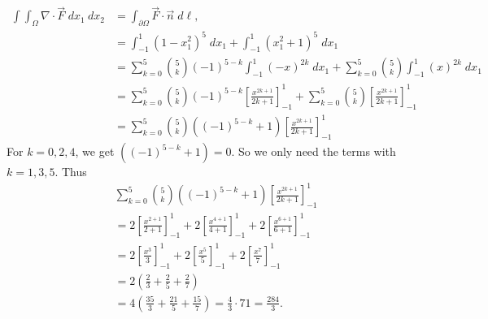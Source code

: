 \documentclass[11pt]{article}
\begin{document}
\begin{solution}
\begin{align*}
        \int \int_{\Omega} \nabla \cdot \vec{F} \;d x_1 \:d x_2 
        &=
        \int_{\partial \Omega}\vec{F}\cdot\vec{n} \;d\ell,
        \\&=
        \int_{-1}^1 (1-x_1^ 2)^ 5 \;dx_1 + \int_{-1}^1 (x_1^2 + 1)^ 5 \;dx_1
        \\&=
        \sum_{k = 0}^5 \binom{5}{k} (-1)^{5-k} \int_{-1}^1 (-x)^{2k} \;dx_1 + \sum_{k = 0}^5 \binom{5}{k}\int_{-1}^1 (x)^{2k} \;dx_1
        \\&=
        \sum_{k = 0}^5 \binom{5}{k} (-1)^{5-k} \left[\frac{x^{2k+1}}{2k+1}\right]_{-1}^1 + \sum_{k = 0}^5 \binom{5}{k} \left[\frac{x^{2k+1}}{2k+1}\right]_{-1}^1
        \\&=
        \sum_{k = 0}^5 \binom{5}{k} \left( (-1)^{5-k} + 1 \right) 
        \left[\frac{x^{2k+1}}{2k+1}\right]_{-1}^1
    \end{align*}
    For $k = 0, 2, 4$, we get $\left( (-1)^{5-k} + 1 \right) = 0$. 
    So we only need the terms with $k = 1, 3, 5$. Thus
    \begin{align*}
        &
        \sum_{k = 0}^5 \binom{5}{k} \left( (-1)^{5-k} + 1 \right) 
        \left[\frac{x^{2k+1}}{2k+1}\right]_{-1}^1
        \\&=
        2
        \left[\frac{x^{2+1}}{2+1}\right]_{-1}^1
        +
        2
        \left[\frac{x^{4+1}}{4+1}\right]_{-1}^1
        +
        2
        \left[\frac{x^{6+1}}{6+1}\right]_{-1}^1
        \\&=
        2
        \left[\frac{x^{3}}{3}\right]_{-1}^1
        +
        2
        \left[\frac{x^{5}}{5}\right]_{-1}^1
        +
        2
        \left[\frac{x^{7}}{7}\right]_{-1}^1
        \\&=
        2 \left( \frac 2 3 + \frac 2 5 + \frac 2 7 \right)
        \\&=
        4 \left( \frac {35} 3 + \frac {21} 5 + \frac {15} 7 \right)
        =
        \frac{4}{3} \cdot 71
        =
        \frac{284}{3}
        .
    \end{align*}
\end{solution}
\end{document}
